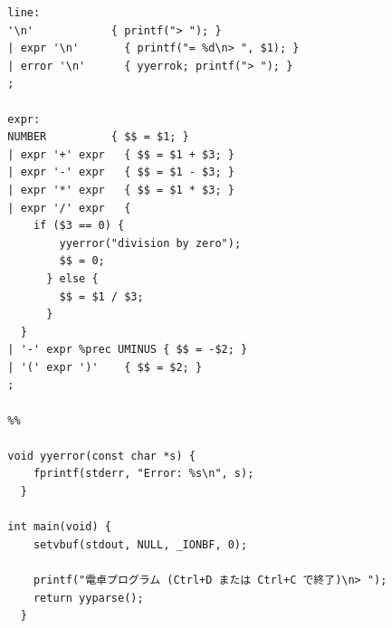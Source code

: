 \documentclass[dvipdfmx]{jarticle}
\begin{document}
\begin{Verbatim}
  line:
  '\n'            { printf("> "); }
  | expr '\n'       { printf("= %d\n> ", $1); }
  | error '\n'      { yyerrok; printf("> "); }
  ;

  expr:
  NUMBER          { $$ = $1; }
  | expr '+' expr   { $$ = $1 + $3; }
  | expr '-' expr   { $$ = $1 - $3; }
  | expr '*' expr   { $$ = $1 * $3; }
  | expr '/' expr   {
      if ($3 == 0) {
          yyerror("division by zero");
          $$ = 0;
        } else {
          $$ = $1 / $3;
        }
    }
  | '-' expr %prec UMINUS { $$ = -$2; }
  | '(' expr ')'    { $$ = $2; }
  ;

  %%

  void yyerror(const char *s) {
      fprintf(stderr, "Error: %s\n", s);
    }

  int main(void) {
      setvbuf(stdout, NULL, _IONBF, 0);

      printf("電卓プログラム (Ctrl+D または Ctrl+C で終了)\n> ");
      return yyparse();
    }
\end{Verbatim}
\end{document}

